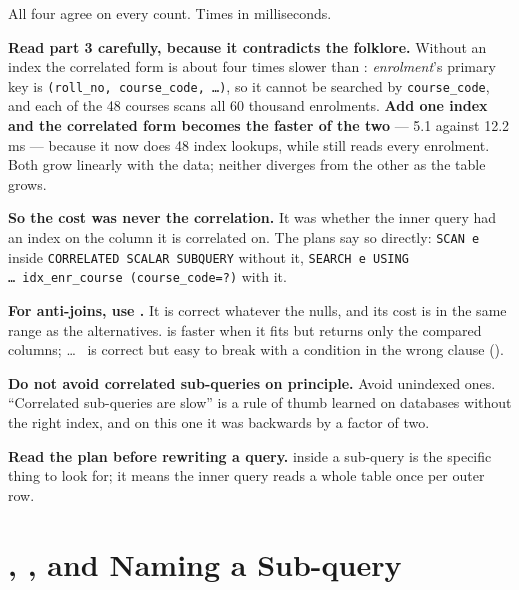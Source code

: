 \begin{measured}
\smallskip
All four agree on every count. Times in milliseconds.

\medskip
\textbf{Read part 3 carefully, because it contradicts the folklore.} Without
an index the correlated form is about four times slower than :
\textit{enrolment}'s primary key is \texttt{(roll\_no, course\_code, \dots)},
so it cannot be searched by \texttt{course\_code}, and each of the 48 courses
scans all 60 thousand enrolments. \textbf{Add one index and the correlated form
becomes the faster of the two} --- 5.1 against 12.2\,ms --- because it now does
48 index lookups, while  still reads every enrolment. Both
grow linearly with the data; neither diverges from the other as the table
grows.

\smallskip
\textbf{So the cost was never the correlation.} It was whether the inner query
had an index on the column it is correlated on. The plans say so directly:
\texttt{SCAN e} inside \texttt{CORRELATED SCALAR SUBQUERY} without it,
\texttt{SEARCH e USING \dots\ idx\_enr\_course (course\_code=?)} with it.
\end{measured}

\begin{alertbox}
\begin{tight}
  \item \textbf{For anti-joins, use .} It is correct
        whatever the nulls, and its cost is in the same range as the
        alternatives.  is faster when it fits but returns only
        the compared columns;  \dots\  is
        correct but easy to break with a condition in the wrong clause
        ().
  \item \textbf{Do not avoid correlated sub-queries on principle.} Avoid
        unindexed ones. ``Correlated sub-queries are slow'' is a rule of thumb
        learned on databases without the right index, and on this one it was
        backwards by a factor of two.
  \item \textbf{Read the plan before rewriting a query.}  inside a
         sub-query is the specific thing to look for; it
        means the inner query reads a whole table once per outer row.
\end{tight}
\end{alertbox}

\section{, , and Naming a Sub-query}

